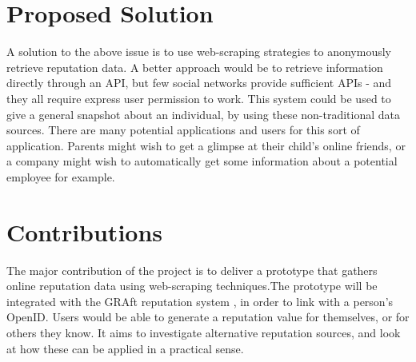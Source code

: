 \section{Proposed Solution}
A solution to the above issue is to use web-scraping strategies to anonymously retrieve reputation data. A better approach would be to retrieve information directly through an API, but few social networks provide sufficient APIs - and they all require express user permission to work. This system could be used to give a general snapshot about an individual, by using these non-traditional data sources. There are many potential applications and users for this sort of application. Parents might wish to get a glimpse at their child's online friends, or a company might wish to automatically get some information about a potential employee for example.

\section{Contributions}
The major contribution of the project is to deliver a prototype that gathers online reputation data using web-scraping techniques.The prototype will be integrated with the GRAft reputation system \cite{graft_paper}, in order to link with a person's OpenID\cite{open_id}. Users would be able to generate a reputation value for themselves, or for others they know. 
It aims to investigate alternative reputation sources, and look at how these can be applied in a practical sense. 